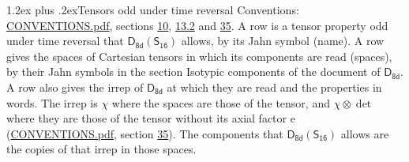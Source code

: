 \documentclass[10pt,a4paper]{article}
\makeatletter
\renewcommand\section{\@startsection{section}{1}{\z@}{-3ex plus -1ex minus -.2ex}%
  {1.2ex plus .2ex}{\normalfont\large\sffamily\bfseries\color{parttitle}}}
\numberwithin{equation}{section}
\newcommand{\grp}[1]{\mathsf{#1}}
\newcommand{\irrprod}{\otimes}
\makeatother
\begin{document}
\section{Tensors odd under time reversal}\label{s:time_odd}
Conventions: \href{../../CONVENTIONS.pdf}{CONVENTIONS.pdf}, sections \href{../../../rotation/CONVENTIONS.pdf\#conv.10}{10}, \href{../../../rotation/CONVENTIONS.pdf\#conv.13.2}{13.2} and \href{../../CONVENTIONS.pdf\#conv.35}{35}.
\leavevmode\label{n:head.name.property}A row is a tensor property odd under time reversal that $\grp{D_{8d}}(\grp{S_{16}})$ allows, by its Jahn symbol (name). \label{n:head.spaces}A row gives the spaces of Cartesian tensors in which its components are read (spaces), by their Jahn symbols in the section Isotypic components of the document of \href{../../../rotation/data/pdf/D8d.pdf}{$\grp{D_{8d}}$}. \label{n:head.properties}A row also gives the irrep of $\grp{D_{8d}}$ at which they are read and the properties in words. The irrep is $\chi$ where the spaces are those of the tensor, and $\chi \irrprod \det$ where they are those of the tensor without its axial factor e (\href{../../CONVENTIONS.pdf}{CONVENTIONS.pdf}, section \href{../../CONVENTIONS.pdf\#conv.35}{35}). The components that $\grp{D_{8d}}(\grp{S_{16}})$ allows are the copies of that irrep in those spaces.
\end{document}
